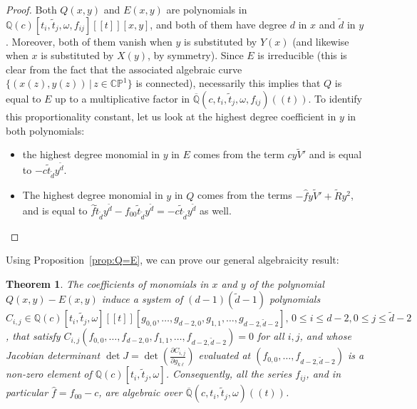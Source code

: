 \documentclass{scrartcl}
\newcommand{\Q}{\mathbb{Q}}
\newcommand{\QQ}{\overline{\mathbb{Q}}}
\newcommand\wt[1]{\widetilde{#1}}
\newcommand\wh[1]{\widehat{#1}}
\newtheorem{thm}{Theorem}[section]
\begin{document}
\begin{proof}
 Both $Q(x,y)$ and $E(x,y)$ are polynomials in $\Q(c)[t_i,\wt t_j,\omega,f_{ij}][[t]][x,y]$, and both of them have degree $d$ in $x$ and $\wt d$ in $y$. Moreover, both of them vanish when $y$ is substituted by $Y(x)$ (and likewise when $x$ is substituted by $X(y)$, by symmetry). Since $E$ is irreducible (this is clear from the fact that the associated algebraic curve $\{(x(z),y(z))\, | \, z \in \mathbb{CP}^1\}$ is connected), necessarily this implies that $Q$ is equal to $E$ up to a multiplicative factor in $\QQ(c,t_i,\wt t_j,\omega,f_{ij})((t))$. To identify this proportionality constant, let us look at the highest degree coefficient in $y$ in both polynomials:
\begin{itemize}
\item the highest degree monomial in $y$ in $E$ comes from the term $cy\widetilde{V}'$ and is equal to $-c\widetilde{t}_{\widetilde{d}}y^{\tilde{d}}$.
\item The highest degree monomial in $y$ in $Q$ comes from the terms $-\widehat{f}y\widetilde{V}'+\widetilde{R}y^2$, and is equal to $\widehat{f}\widetilde{t}_{\widetilde{d}}y^{\widetilde{d}} - f_{00}\widetilde{t}_{\widetilde{d}}y^{\widetilde{d}} =-c\widetilde{t}_{\widetilde{d}}y^{\tilde{d}}$ as well.
\end{itemize}
\vspace{-1em}\end{proof}

Using Proposition~\ref{prop:Q=E}, we can prove our general algebraicity result:

\begin{thm}
\label{thm:algebraicity}
The coefficients of monomials in $x$ and $y$  of the polynomial $Q(x,y)-E(x,y)$ induce a system of $(d-1)(\wt d -1)$ polynomials $C_{i,j} \in \Q(c)[t_i,\wt t_j,\omega][[t]][g_{0,0}, \dots, g_{d-2,0},g_{1,1}, \dots, g_{d-2,\wt d -2}], \, 0 \leq i \leq d-2,0\leq j\leq \wt{d}-2$, that satisfy $C_{i,j}(f_{0,0}, \dots, f_{d-2,0},f_{1,1}, \dots, f_{d-2,\wt d -2})=0$ for all $i,j$, and whose Jacobian determinant $\det J=\det(\frac{\partial C_{i,j}}{\partial g_{k\ell}})$ evaluated at $(f_{0,0},\dots,f_{d-2,\wt{d}-2})$ is a non-zero element of $\Q(c)[t_i,\wt t_j,\omega]$. Consequently, all the series $f_{ij}$, and in particular $\wh{f}=f_{00}-c$, are algebraic over $\QQ(c,t_i,\wt t_j,\omega)((t))$.
\end{thm}
\end{document}
